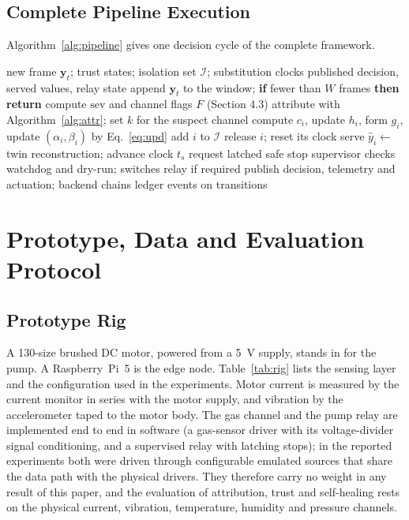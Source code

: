 \documentclass[11pt,a4paper]{article}
\begin{document}
\subsection{Complete Pipeline Execution}

Algorithm~\ref{alg:pipeline} gives one decision cycle of the complete framework.

\begin{algorithm}[H]
\caption{One decision cycle on the edge node}
\label{alg:pipeline}
\begin{algorithmic}[1]
\Require new frame $\mathbf{y}_t$; trust states; isolation set $\mathcal{I}$; substitution clocks
\Ensure published decision, served values, relay state
\State append $\mathbf{y}_t$ to the window; \textbf{if} fewer than $W$ frames \textbf{then return}
\State compute $\mathrm{sev}$ and channel flags $F$ (Section 4.3)
\State attribute with Algorithm~\ref{alg:attr}; set $k$ for the suspect channel
  \State compute $c_i$, update $h_i$, form $g_i$, update $(\alpha_i, \beta_i)$ by Eq.~\eqref{eq:upd}
   \State add $i$ to $\mathcal{I}$  \State release $i$; reset its clock \EndIf
\EndFor
{}
  \State serve $\hat{y}_i \gets$ twin reconstruction; advance clock $t_s$
   \State request latched safe stop \EndIf
\EndFor
\State supervisor checks watchdog and dry-run; switches relay if required
\State publish decision, telemetry and actuation; backend chains ledger events on transitions
\end{algorithmic}
\end{algorithm}

\section{Prototype, Data and Evaluation Protocol}
\label{sec:setup}

\subsection{Prototype Rig}

A 130-size brushed DC motor, powered from a 5~V supply, stands in for the pump. A Raspberry~Pi~5 is the edge node. Table~\ref{tab:rig} lists the sensing layer and the configuration used in the experiments. Motor current is measured by the current monitor in series with the motor supply, and vibration by the accelerometer taped to the motor body. The gas channel and the pump relay are implemented end to end in software (a gas-sensor driver with its voltage-divider signal conditioning, and a supervised relay with latching stops); in the reported experiments both were driven through configurable emulated sources that share the data path with the physical drivers. They therefore carry no weight in any result of this paper, and the evaluation of attribution, trust and self-healing rests on the physical current, vibration, temperature, humidity and pressure channels.
\end{document}
